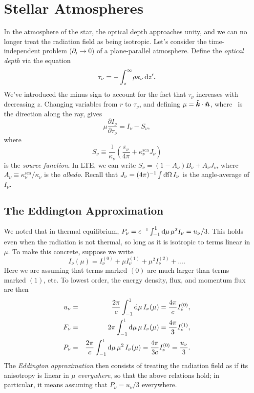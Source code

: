 \chapter[Stellar Atmospheres]{Stellar Atmospheres}

In the atmosphere of the star, the optical depth approaches unity, and we can no longer treat the radiation field as being isotropic. Let's consider the time-independent problem ($\partial_{t}\to 0$) of a plane-parallel atmosphere. Define the \emph{optical depth} via the equation
\begin{equation}\label{e.optical-depth}
\tau_{\nu} = - \int _{z}^{\infty}\!\rho\kappa_{\nu}\,\mathrm{d} z'.
\end{equation}
We've introduced the minus sign to account for the fact that $\tau_{\nu}$ increases with decreasing $z$.
Changing variables from $r$ to $\tau_{\nu}$, and defining $\mu = \boldsymbol{\hat{k}}\cdot\boldsymbol{\hat{n}}$, where \unitn\ is the direction along the ray, gives
\begin{equation}\label{e.planar}
\mu\frac{\partial I_{\nu}}{\partial\tau_{\nu}} = I_{\nu}-S_{\nu},
\end{equation}
where 
\begin{equation}\label{e.source}
S_{\nu} \equiv \frac{1}{\kappa_{\nu}}\left(\frac{\varepsilon_{\nu}}{4\pi} + \kappa_{\nu}^{\mathrm{sca}}J_{\nu}\right)
\end{equation}
is the \emph{source function}. In LTE, we can write $S_{\nu} = (1-A_{\nu})B_{\nu} + A_{\nu}J_{\nu}$, where $A_{\nu} \equiv \kappa_{\nu}^{\mathrm{sca}}/\kappa_{\nu}$ is the \emph{albedo}.  Recall that $J_{\nu} = (4\pi)^{-1}\int\mathrm{d}\Omega\,I_{\nu}$ is the angle-average of $I_{\nu}$.

\section{The Eddington Approximation}

We noted that in thermal equilibrium, $P_{\nu} = c^{-1}\int_{-1}^{1}\mathrm{d}\mu\,\mu^{2}I_{\nu} = u_{\nu}/3$. This holds even when the radiation is not thermal, so long as it is isotropic to terms linear in $\mu$.  To make this concrete, suppose we write
\[ I_{\nu}(\mu) = I_{\nu}^{(0)} + \mu I_{\nu}^{(1)} + \mu^{2}I_{\nu}^{(2)} + \ldots. \]
Here we are assuming that terms marked $(0)$ are much larger than terms marked $(1)$, etc.  To lowest order, the energy density, flux, and momentum flux are then
\begin{eqnarray*}
u_{\nu} &=& \frac{2\pi}{c}\int_{-1}^{1}\mathrm{d}\mu\,I_{\nu}(\mu) = \frac{4\pi}{c} I_{\nu}^{(0)},\\
F_{\nu} &=& 2\pi\int_{-1}^{1}\mathrm{d}\mu\,\mu\,I_{\nu}(\mu) = \frac{4\pi}{3} I_{\nu}^{(1)},\\
P_{\nu} &=& \frac{2\pi}{c}\int_{-1}^{1}\mathrm{d}\mu\,\mu^{2}\,I_{\nu}(\mu) = \frac{4\pi}{3c}I_{\nu}^{(0)} = \frac{u_{\nu}}{3}.
\end{eqnarray*}
The \emph{Eddington approximation} then consists of treating the radiation field as if its anisotropy is linear in $\mu$ \emph{everywhere}, so that the above relations hold; in particular, it means assuming that $P_{\nu} = u_{\nu}/3$ everywhere.

